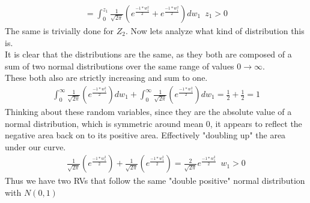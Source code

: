 \documentclass[11pt]{article}
\begin{document}
\begin{enumerate}
\begin{enumerate}
\begin{gather}
		= \int_{0}^{z_1}\frac{1}{\sqrt{2\pi}}(e^\frac{-1*w_1^2}{2} + e^\frac{-1*w_1^2}{2})dw_1 \, \, \, z_1>0
	\end{gather}
	The same is trivially done for $Z_2$. Now lets analyze what kind of distribution this is.\\
	It is clear that the distributions are the same, as they both are composed of a sum of two normal distributions over the same range of values $0 \rightarrow \infty$.\\
	These both also are strictly increasing and sum to one.\\
	\begin{gather}
		\int_{0}^{\infty}\frac{1}{\sqrt{2\pi}}(e^\frac{-1*w_1^2}{2})dw_1 + \int_{0}^{\infty}\frac{1}{\sqrt{2\pi}}(e^\frac{-1*w_1^2}{2})dw_1 = \frac{1}{2} + \frac{1}{2} = 1
	\end{gather} Thinking about these random variables, since they are the absolute value of a normal distribution, which is symmetric around mean 0, it appears to reflect the negative area back on to its positive area. Effectively "doubling up" the area under our curve.
	\begin{gather}
	\frac{1}{\sqrt{2\pi}}(e^\frac{-1*w_1^2}{2}) + \frac{1}{\sqrt{2\pi}}(e^\frac{-1*w_1^2}{2}) =
		\frac{2}{\sqrt{2\pi}} e^\frac{-1*w_1^2}{2} \, \, \, w_1>0
	\end{gather}
	Thus we have two RVs that follow the same "double positive" normal distribution with $N(0,1)$
\end{enumerate}
\end{enumerate}
\end{document}
